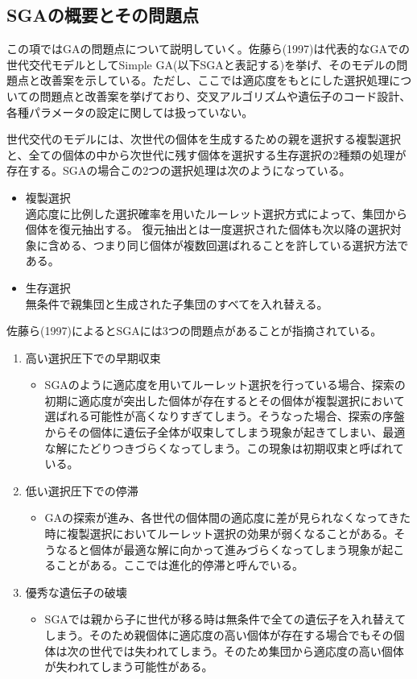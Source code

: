 
\subsection{SGAの概要とその問題点}
この項ではGAの問題点について説明していく。佐藤ら(1997)は代表的なGAでの世代交代モデルとしてSimple GA(以下SGAと表記する)を挙げ、そのモデルの問題点と改善案を示している。ただし、ここでは適応度をもとにした選択処理についての問題点と改善案を挙げており、交叉アルゴリズムや遺伝子のコード設計、各種パラメータの設定に関しては扱っていない。

世代交代のモデルには、次世代の個体を生成するための親を選択する複製選択と、全ての個体の中から次世代に残す個体を選択する生存選択の2種類の処理が存在する。SGAの場合この2つの選択処理は次のようになっている。

\begin{itemize}
\item{複製選択}\\
適応度に比例した選択確率を用いたルーレット選択方式によって、集団から個体を復元抽出する。
復元抽出とは一度選択された個体も次以降の選択対象に含める、つまり同じ個体が複数回選ばれることを許している選択方法である。
\item{生存選択}\\
無条件で親集団と生成された子集団のすべてを入れ替える。
\end{itemize}

佐藤ら(1997)によるとSGAには3つの問題点があることが指摘されている。
\begin{enumerate}
\item{高い選択圧下での早期収束}
\begin{itemize}
\item{SGAのように適応度を用いてルーレット選択を行っている場合、探索の初期に適応度が突出した個体が存在するとその個体が複製選択において選ばれる可能性が高くなりすぎてしまう。そうなった場合、探索の序盤からその個体に遺伝子全体が収束してしまう現象が起きてしまい、最適な解にたどりつきづらくなってしまう。この現象は初期収束と呼ばれている。}
\end{itemize}
\item{低い選択圧下での停滞}
\begin{itemize}
\item{GAの探索が進み、各世代の個体間の適応度に差が見られなくなってきた時に複製選択においてルーレット選択の効果が弱くなることがある。そうなると個体が最適な解に向かって進みづらくなってしまう現象が起こることがある。ここでは進化的停滞と呼んでいる。}
\end{itemize}
\item{優秀な遺伝子の破壊}
\begin{itemize}
\item{SGAでは親から子に世代が移る時は無条件で全ての遺伝子を入れ替えてしまう。そのため親個体に適応度の高い個体が存在する場合でもその個体は次の世代では失われてしまう。そのため集団から適応度の高い個体が失われてしまう可能性がある。}
\end{itemize}
\end{enumerate}


